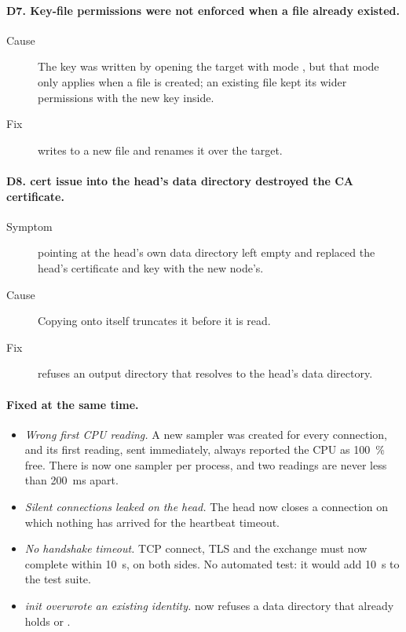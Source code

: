 \documentclass{article}
\begin{document}
\paragraph{D7. Key-file permissions were not enforced when a file already existed.}
\begin{description}
  \item[Cause] The key was written by opening the target with mode
    , but that mode only applies when a file is created; an
    existing file kept its wider permissions with the new key inside.
  \item[Fix]  writes to a new 
    file and renames it over the target.
\end{description}

\paragraph{D8. cert issue into the head's data directory destroyed the CA certificate.}
\begin{description}
  \item[Symptom]  pointing at the head's
    own data directory left  empty and replaced the head's
    certificate and key with the new node's.
  \item[Cause] Copying  onto itself truncates it before it is
    read.
  \item[Fix]  refuses an output directory that resolves
    to the head's data directory.
\end{description}

\paragraph{Fixed at the same time.}
\begin{itemize}
  \item \emph{Wrong first CPU reading.} A new sampler was created for
    every connection, and its first reading, sent immediately, always
    reported the CPU as 100~\% free. There is now one sampler per process,
    and two readings are never less than 200~ms apart.
  \item \emph{Silent connections leaked on the head.} The head now closes
    a connection on which nothing has arrived for the heartbeat timeout.
  \item \emph{No handshake timeout.} TCP connect, TLS and the
     exchange must now complete within 10~s, on both sides.
    No automated test: it would add 10~s to the test suite.
  \item \emph{init overwrote an existing identity.} 
    now refuses a data directory that already holds  or
    .
\end{itemize}
\end{document}

